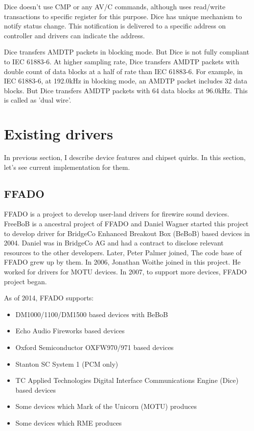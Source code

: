 \documentclass[onecolumn]{article}
\begin{document}
Dice doesn't use CMP or any AV/C commands, although uses read/write transactions to specific register for this purpose. Dice has unique mechanism to notify status change. This notification is delivered to a specific address on controller and drivers can indicate the address.

Dice transfers AMDTP packets in blocking mode. But Dice is not fully compliant to IEC 61883-6. At higher sampling rate, Dice transfers AMDTP packets with double count of data blocks at a half of rate than IEC 61883-6. For example, in IEC 61883-6, at 192.0kHz in blocking mode, an AMDTP packet includes 32 data blocks. But Dice transfers AMDTP packets with 64 data blocks at 96.0kHz. This is called as 'dual wire'.


\section{Existing drivers}

In previous section, I describe device features and chipset quirks. In this section, let's see current implementation for them.

\subsection{FFADO}
FFADO is a project to develop user-land drivers for firewire sound devices. FreeBoB is a ancestral project of FFADO and Daniel Wagner started this project to develop driver for BridgeCo Enhanced Breakout Box (BeBoB) based devices in 2004. Daniel was in BridgeCo AG and had a contract to disclose relevant resources to the other developers. Later, Peter Palmer joined, The code base of FFADO grew up by them. In 2006, Jonathan Woithe joined in this project. He worked for drivers for MOTU devices. In 2007, to support more devices, FFADO project began.

As of 2014, FFADO supports:
\begin{itemize}
\item DM1000/1100/DM1500 based devices with BeBoB
\item Echo Audio Fireworks based devices
\item Oxford Semiconductor OXFW970/971 based devices
\item Stanton SC System 1 (PCM only)
\item TC Applied Technologies Digital Interface Communications Engine (Dice) based devices 
\item Some devices which Mark of the Unicorn (MOTU) produces
\item Some devices which RME produces
\end{itemize}
\end{document}
